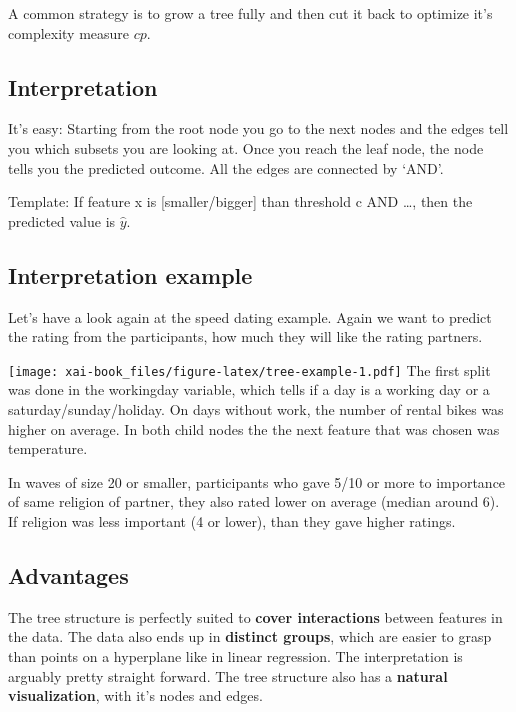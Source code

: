 \documentclass[12pt,]{krantz}
\theoremstyle{definition}
\theoremstyle{definition}
\theoremstyle{definition}
\theoremstyle{remark}
\begin{document}
A common strategy is to grow a tree fully and then cut it back to
optimize it's complexity measure \(cp\).

\subsection{Interpretation}\label{interpretation-2}

It's easy: Starting from the root node you go to the next nodes and the
edges tell you which subsets you are looking at. Once you reach the leaf
node, the node tells you the predicted outcome. All the edges are
connected by `AND'.

Template: If feature x is {[}smaller/bigger{]} than threshold c AND
\ldots{}, then the predicted value is \(\hat{y}\).

\subsection{Interpretation example}\label{interpretation-example-1}

Let's have a look again at the speed dating example. Again we want to
predict the rating from the participants, how much they will like the
rating partners.

\texttt{[image: xai-book\_files/figure-latex/tree-example-1.pdf]} The
first split was done in the workingday variable, which tells if a day is
a working day or a saturday/sunday/holiday. On days without work, the
number of rental bikes was higher on average. In both child nodes the
the next feature that was chosen was temperature.

In waves of size 20 or smaller, participants who gave 5/10 or more to
importance of same religion of partner, they also rated lower on average
(median around 6). If religion was less important (4 or lower), than
they gave higher ratings.

\subsection{Advantages}\label{advantages}

The tree structure is perfectly suited to \textbf{cover interactions}
between features in the data. The data also ends up in \textbf{distinct
groups}, which are easier to grasp than points on a hyperplane like in
linear regression. The interpretation is arguably pretty straight
forward. The tree structure also has a \textbf{natural visualization},
with it's nodes and edges.
\end{document}
